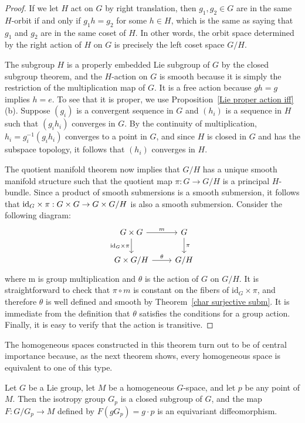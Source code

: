 \begin{proof}
If we let $H$ act on $G$ by right translation, then $g_1,g_2\in G$ are in the same $H$-orbit if and only if $g_1h=g_2$ for some $h\in H$, which is the same as saying that $g_1$ and $g_2$ are in the same coset of $H$. In other words, the orbit space determined by the right action of $H$ on $G$ is precisely the left coset space $G/H$.\par
The subgroup $H$ is a properly embedded Lie subgroup of $G$ by the closed subgroup theorem, and the $H$-action on $G$ is smooth because it is simply the restriction of the multiplication map of $G$. It is a free action because $gh=g$ implies $h=e$. To see that it is proper, we use Proposition~\ref{Lie proper action iff}(b). Suppose $(g_i)$ is a convergent sequence in $G$ and $(h_i)$ is a sequence in $H$ such that $(g_ih_i)$ converges in $G$. By the continuity of multiplication, $h_i=g_i^{-1}(g_ih_i)$ converges to a point in $G$, and since $H$ is closed in $G$ and has the subspace topology, it follows that $(h_i)$ converges in $H$.\par
The quotient manifold theorem now implies that $G/H$ has a unique smooth manifold structure such that the quotient map $\pi:G\to G/H$ is a principal $H$-bundle. Since a product of smooth submersions is a smooth submersion, it follows that $\mathrm{id}_G\times\pi:G\times G\to G\times G/H$ is also a smooth submersion. Consider the following diagram:
\[\begin{tikzcd}
G\times G\ar[r,"m"]\ar[d,swap,"\mathrm{id}_G\times\pi"]&G\ar[d,"\pi"]\\
G\times G/H\ar[r,"\theta"]&G/H
\end{tikzcd}\]
where m is group multiplication and $\theta$ is the action of $G$ on $G/H$. It is straightforward to check that $\pi\circ m$ is constant on the fibers of $\mathrm{id}_G\times\pi$, and therefore $\theta$ is well defined and smooth by Theorem~\ref{char surjective subm}. It is immediate from the definition that $\theta$ satisfies the conditions for a group action. Finally, it is easy to verify that the action is transitive.
\end{proof}
The homogeneous spaces constructed in this theorem turn out to be of central importance because, as the next theorem shows, every homogeneous space is equivalent
to one of this type.
\begin{theorem}\label{homogeneous char}
Let $G$ be a Lie group, let $M$ be a homogeneous $G$-space, and let $p$ be any point of $M$. Then the isotropy group $G_p$ is a closed subgroup of $G$, and the map $F:G/G_p\to M$ defined by $F(gG_p)=g\cdot p$ is an equivariant diffeomorphism.
\end{theorem}
